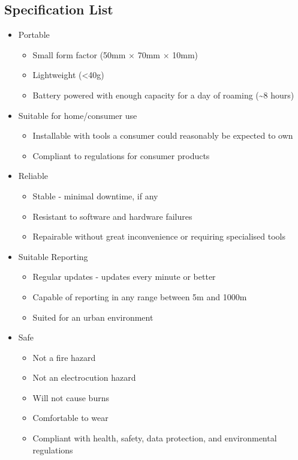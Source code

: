 \documentclass[11pt]{article}
\begin{document}
\subsection{Specification List}
\begin{itemize}
    \item Portable
    \begin{itemize}
        \item Small form factor (50mm $\times$ 70mm $\times$ 10mm)
        \item Lightweight (<40g)
        \item Battery powered with enough capacity for a day of roaming (\textasciitilde8 hours)
    \end{itemize}
    \item Suitable for home/consumer use
    \begin{itemize}
        \item Installable with tools a consumer could reasonably be expected to own
        \item Compliant to regulations for consumer products
    \end{itemize}
    \item Reliable
    \begin{itemize}
        \item Stable - minimal downtime, if any
        \item Resistant to software and hardware failures
        \item Repairable without great inconvenience or requiring specialised tools
    \end{itemize}
    \item Suitable Reporting
    \begin{itemize}
        \item Regular updates - updates every minute or better
        \item Capable of reporting in any range between 5m and 1000m 
        \item Suited for an urban environment
    \end{itemize}
    \item Safe
    \begin{itemize}
        \item Not a fire hazard
        \item Not an electrocution hazard
        \item Will not cause burns
        \item Comfortable to wear
        \item Compliant with health, safety, data protection, and environmental regulations
    \end{itemize}
\end{itemize}
\end{document}
